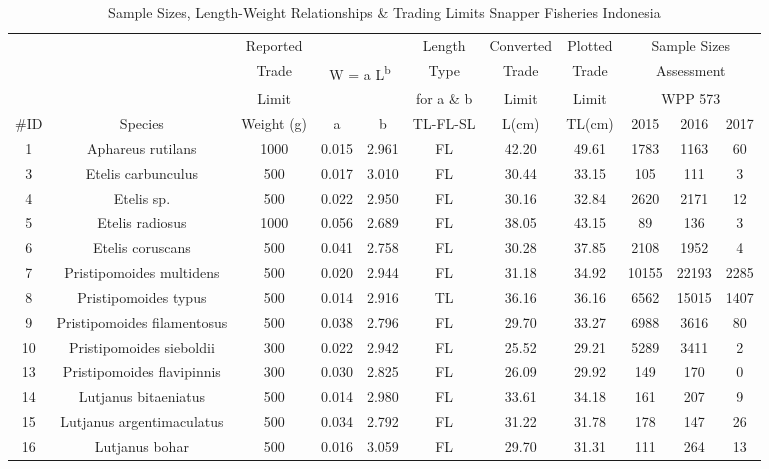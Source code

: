 \documentclass{report}\usepackage[]{graphicx}\usepackage[]{color}
\begin{document}
\begin{table}[ht]
\centering
\caption{Sample Sizes, Length-Weight Relationships \& Trading Limits Snapper Fisheries Indonesia} 
{\small
\begin{tabular}{ccccccccccc}
  \hline
  { } & { } & {Reported} & { } & { } & {Length} & {Converted} & {Plotted} & \multicolumn{3}{c}{Sample Sizes}\\
      { } & { } & {Trade} & \multicolumn{2}{c}{ W = a L\textsuperscript{b}} & {Type} & {Trade} & {Trade} & \multicolumn{3}{c}{Assessment}\\
      { } & { } & {Limit} & { } & { } & {for a \& b} & {Limit} & {Limit} & \multicolumn{3}{c}{WPP 573}\\
      {\#ID} & {Species} & {Weight (g)} & {a} & {b} & {TL-FL-SL} & {L(cm)} & {TL(cm)} & {2015} & {2016} & {2017}\\ \hline
1 & Aphareus rutilans & 1000 & 0.015 & 2.961 & FL & 42.20 & 49.61 & 1783 & 1163 & 60 \\ 
  3 & Etelis carbunculus & 500 & 0.017 & 3.010 & FL & 30.44 & 33.15 & 105 & 111 & 3 \\ 
  4 & Etelis sp. & 500 & 0.022 & 2.950 & FL & 30.16 & 32.84 & 2620 & 2171 & 12 \\ 
  5 & Etelis radiosus & 1000 & 0.056 & 2.689 & FL & 38.05 & 43.15 & 89 & 136 & 3 \\ 
  6 & Etelis coruscans & 500 & 0.041 & 2.758 & FL & 30.28 & 37.85 & 2108 & 1952 & 4 \\ 
  7 & Pristipomoides multidens & 500 & 0.020 & 2.944 & FL & 31.18 & 34.92 & 10155 & 22193 & 2285 \\ 
  8 & Pristipomoides typus & 500 & 0.014 & 2.916 & TL & 36.16 & 36.16 & 6562 & 15015 & 1407 \\ 
  9 & Pristipomoides filamentosus & 500 & 0.038 & 2.796 & FL & 29.70 & 33.27 & 6988 & 3616 & 80 \\ 
  10 & Pristipomoides sieboldii & 300 & 0.022 & 2.942 & FL & 25.52 & 29.21 & 5289 & 3411 & 2 \\ 
  13 & Pristipomoides flavipinnis & 300 & 0.030 & 2.825 & FL & 26.09 & 29.92 & 149 & 170 & 0 \\ 
  14 & Lutjanus bitaeniatus & 500 & 0.014 & 2.980 & FL & 33.61 & 34.18 & 161 & 207 & 9 \\ 
  15 & Lutjanus argentimaculatus & 500 & 0.034 & 2.792 & FL & 31.22 & 31.78 & 178 & 147 & 26 \\ 
  16 & Lutjanus bohar & 500 & 0.016 & 3.059 & FL & 29.70 & 31.31 & 111 & 264 & 13 \\ 

\end{tabular}}
\end{table}
\end{document}
